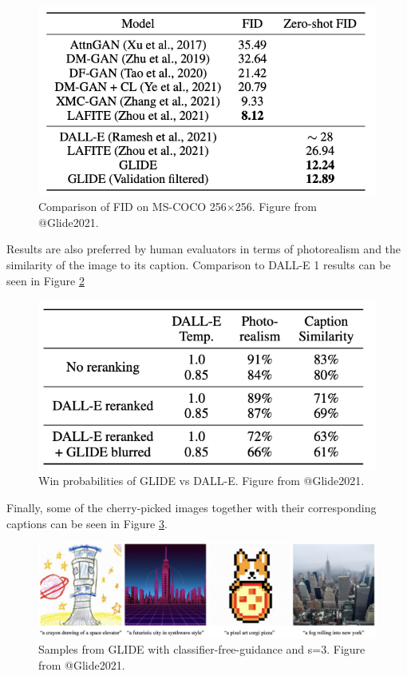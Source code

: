 \documentclass[
]{krantz}
\begin{document}
\begin{figure}

{\centering \includegraphics[width=0.6\linewidth]{figures/02-02-text-2-img/glidefid} 

}

\caption{Comparison of FID on MS-COCO 256×256. Figure from @Glide2021.}\label{fig:glidefid}
\end{figure}

Results are also preferred by human evaluators in terms of photorealism and the similarity of the image to its caption. Comparison to DALL-E 1 results can be seen in Figure \ref{fig:gliderealism}

\begin{figure}

{\centering \includegraphics[width=0.6\linewidth]{figures/02-02-text-2-img/gliderealism} 

}

\caption{Win probabilities of GLIDE vs DALL-E. Figure from @Glide2021.}\label{fig:gliderealism}
\end{figure}

Finally, some of the cherry-picked images together with their corresponding captions can be seen in Figure \ref{fig:glideresults}.

\begin{figure}

{\centering \includegraphics[width=1\linewidth]{figures/02-02-text-2-img/glideresults} 

}

\caption{Samples from GLIDE with classifier-free-guidance and s=3. Figure from @Glide2021.}\label{fig:glideresults}
\end{figure}
\end{document}
